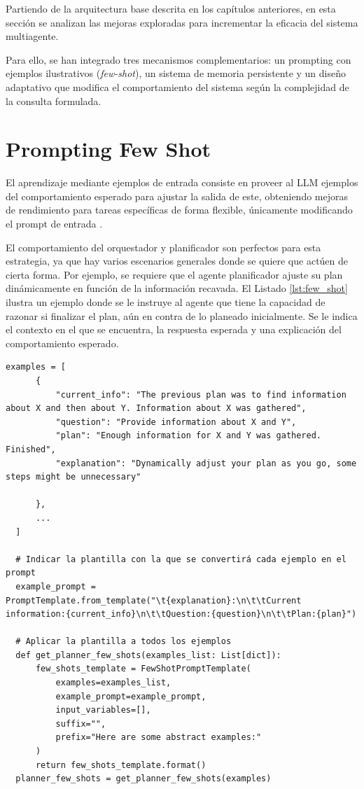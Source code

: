 Partiendo de la arquitectura base descrita en los capítulos anteriores, en esta sección se analizan las mejoras exploradas para incrementar la eficacia del sistema multiagente.

Para ello, se han integrado tres mecanismos complementarios: un prompting con ejemplos ilustrativos (\textit{few-shot}), un sistema de memoria persistente y un diseño adaptativo que modifica el comportamiento del sistema según la complejidad de la consulta formulada.

\section{Prompting Few Shot}
El aprendizaje mediante ejemplos de entrada consiste en proveer al LLM ejemplos del comportamiento esperado para ajustar la salida de este, obteniendo mejoras de rendimiento para tareas específicas de forma flexible, únicamente modificando el prompt de entrada \cite{brown_language_2020}.

El comportamiento del orquestador y planificador son perfectos para esta estrategia, ya que hay varios escenarios generales donde se quiere que actúen de cierta forma. Por ejemplo, se requiere que el agente planificador ajuste su plan dinámicamente en función de la información recavada. El Listado \ref{lst:few_shot} ilustra un ejemplo donde se le instruye al agente que tiene la capacidad de razonar si finalizar el plan, aún en contra de lo planeado inicialmente. Se le indica el contexto en el que se encuentra, la respuesta esperada y una explicación del comportamiento esperado. 

\begin{lstlisting}[caption={Integración de ejemplos few shot al agente planificador},label={lst:few_shot}]
  examples = [
      {
          "current_info": "The previous plan was to find information about X and then about Y. Information about X was gathered",
          "question": "Provide information about X and Y",
          "plan": "Enough information for X and Y was gathered. Finished",
          "explanation": "Dynamically adjust your plan as you go, some steps might be unnecessary"

      },
      ...
  ]

  # Indicar la plantilla con la que se convertirá cada ejemplo en el prompt
  example_prompt = PromptTemplate.from_template("\t{explanation}:\n\t\tCurrent information:{current_info}\n\t\tQuestion:{question}\n\t\tPlan:{plan}")

  # Aplicar la plantilla a todos los ejemplos
  def get_planner_few_shots(examples_list: List[dict]):
      few_shots_template = FewShotPromptTemplate(
          examples=examples_list,
          example_prompt=example_prompt,
          input_variables=[],
          suffix="",
          prefix="Here are some abstract examples:"
      )
      return few_shots_template.format()
  planner_few_shots = get_planner_few_shots(examples)
\end{lstlisting}

